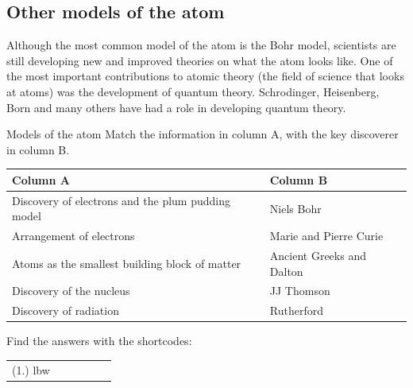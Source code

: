             \subsection*{Other models of the atom}
            \nopagebreak
            \label{m38756*eip-993}
Although the most common model of the atom is the Bohr model, scientists are still developing new and improved theories on what the atom looks like. One of the most important contributions to atomic theory (the field of science that looks at atoms) was the development of quantum theory. Schrodinger, Heisenberg, Born and many others have had a role in developing quantum theory.  
\par \label{m38756*eip-179}
            \begin{exercises}{Models of the atom}
            \nopagebreak
            \label{m38756*eip-786}Match the information in column A, with the key discoverer in column B.
          \begin{table}[H]
        \begin{center}
      \label{m38756*eip-551}
      \begin{tabular}{|l|l|}\hline
        \textbf{Column A} &
        \textbf{Column B} \\ \hline
        Discovery of electrons and the plum pudding model &
        Niels Bohr \\ \hline
        Arrangement of electrons &
        Marie and Pierre Curie  \\ \hline
        Atoms as the smallest building block of matter &
        Ancient Greeks and Dalton \\ \hline
        Discovery of the nucleus &
        JJ Thomson \\ \hline
        Discovery of radiation &
        Rutherford \\ \hline
    \end{tabular}
      \end{center}
\end{table}
    \par
        \par 
    \label{m38756*cid3}
\practiceinfo
\par {} Find the answers with the shortcodes:
 \par \begin{tabular}[h]{cccccc}
 (1.) lbw  & \end{tabular}
\end{exercises}
